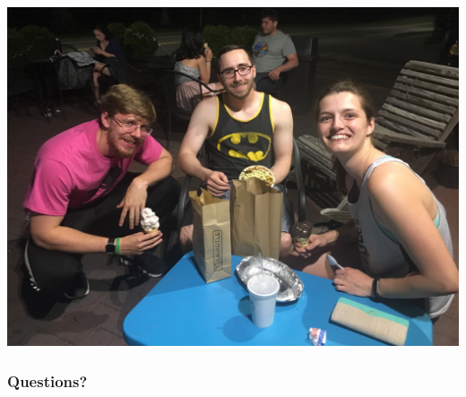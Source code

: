 \documentclass[11pt]{beamer}
\begin{document}
\begin{frame}
\begin{center}
	\includegraphics[scale=0.05]{questions.jpg} 
\end{center}
\frametitle{{\textbf{\huge Questions?}}}
\end{frame}
\end{document}
